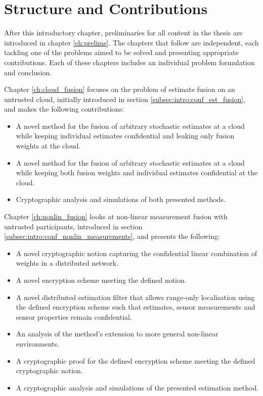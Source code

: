 % 
%                                                
%                                                
%                                                
% 

\section{Structure and Contributions}\label{sec:intro:contributions}
After this introductory chapter, preliminaries for all content in the thesis are introduced in chapter \ref{ch:prelims}. The chapters that follow are independent, each tackling one of the problems aimed to be solved and presenting appropriate contributions. Each of these chapters includes an individual problem formulation and conclusion. 

Chapter \ref{ch:cloud_fusion} focuses on the problem of estimate fusion on an untrusted cloud, initially introduced in section \ref{subsec:intro:conf_est_fusion}, and makes the following contributions:
\begin{itemize}
    \item A novel method for the fusion of arbitrary stochastic estimates at a cloud while keeping individual estimates confidential and leaking only fusion weights at the cloud.
    \item A novel method for the fusion of arbitrary stochastic estimates at a cloud while keeping both fusion weights and individual estimates confidential at the cloud.
    \item Cryptographic analysis and simulations of both presented methods.
\end{itemize}

Chapter \ref{ch:nonlin_fusion} looks at non-linear measurement fusion with untrusted participants, introduced in section \ref{subsec:intro:conf_nonlin_measurements}, and presents the following:
\begin{itemize}
    \item A novel cryptographic notion capturing the confidential linear combination of weights in a distributed network.
    \item A novel encryption scheme meeting the defined notion.
    \item A novel distributed estimation filter that allows range-only localisation using the defined encryption scheme such that estimates, sensor measurements and sensor properties remain confidential.
    \item An analysis of the method's extension to more general non-linear environments.
    \item A cryptographic proof for the defined encryption scheme meeting the defined cryptographic notion.
    \item A cryptographic analysis and simulations of the presented estimation method.
\end{itemize}


